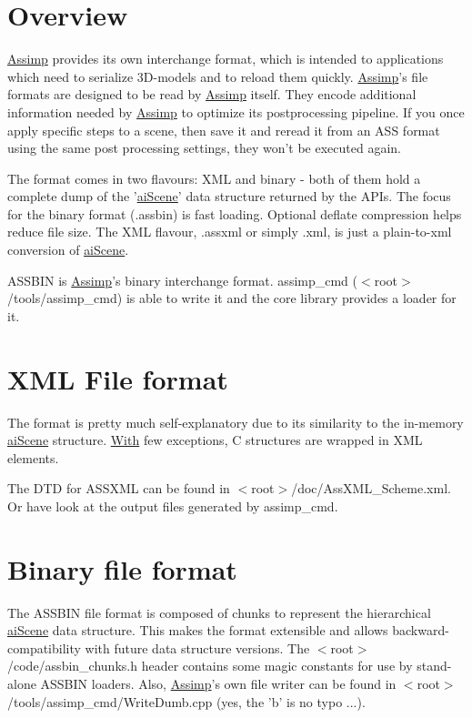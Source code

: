 \hypertarget{assfile_over}{}\section{Overview}\label{assfile_over}
\hyperlink{class_assimp}{Assimp} provides its own interchange format, which is intended to applications which need to serialize 3\+D-\/models and to reload them quickly. \hyperlink{class_assimp}{Assimp}'s file formats are designed to be read by \hyperlink{class_assimp}{Assimp} itself. They encode additional information needed by \hyperlink{class_assimp}{Assimp} to optimize its postprocessing pipeline. If you once apply specific steps to a scene, then save it and reread it from an A\+S\+S format using the same post processing settings, they won't be executed again.

The format comes in two flavours\+: X\+M\+L and binary -\/ both of them hold a complete dump of the '\hyperlink{structai_scene}{ai\+Scene}' data structure returned by the A\+P\+Is. The focus for the binary format ({\ttfamily .assbin}) is fast loading. Optional deflate compression helps reduce file size. The X\+M\+L flavour, {\ttfamily .assxml} or simply .xml, is just a plain-\/to-\/xml conversion of \hyperlink{structai_scene}{ai\+Scene}.

A\+S\+S\+B\+I\+N is \hyperlink{class_assimp}{Assimp}'s binary interchange format. assimp\+\_\+cmd ({\ttfamily $<$root$>$/tools/assimp\+\_\+cmd}) is able to write it and the core library provides a loader for it.\hypertarget{assfile_assxml}{}\section{X\+M\+L File format}\label{assfile_assxml}
The format is pretty much self-\/explanatory due to its similarity to the in-\/memory \hyperlink{structai_scene}{ai\+Scene} structure. \hyperlink{struct_with}{With} few exceptions, C structures are wrapped in X\+M\+L elements.

The D\+T\+D for A\+S\+S\+X\+M\+L can be found in {\ttfamily $<$root$>$/doc/\+Ass\+X\+M\+L\+\_\+\+Scheme.xml}. Or have look at the output files generated by assimp\+\_\+cmd.\hypertarget{assfile_assbin}{}\section{Binary file format}\label{assfile_assbin}
The A\+S\+S\+B\+I\+N file format is composed of chunks to represent the hierarchical \hyperlink{structai_scene}{ai\+Scene} data structure. This makes the format extensible and allows backward-\/compatibility with future data structure versions. The {\ttfamily $<$root$>$/code/assbin\+\_\+chunks.h} header contains some magic constants for use by stand-\/alone A\+S\+S\+B\+I\+N loaders. Also, \hyperlink{class_assimp}{Assimp}'s own file writer can be found in {\ttfamily $<$root$>$/tools/assimp\+\_\+cmd/\+Write\+Dumb.cpp} (yes, the 'b' is no typo ...).

